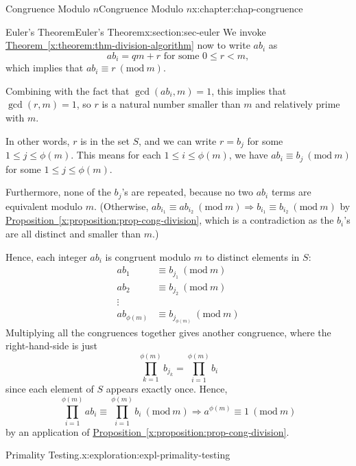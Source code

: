 \documentclass[oneside,10pt,]{book}
\newcommand{\xreffont}{\relax}
\numberwithin{equation}{section}
\newcommand{\Mod}[1]{\ \left(\mathrm{mod}\ #1\right)}
\newcommand{\lt}{<}
\newcommand{\amp}{&}
\begin{document}
\begin{chapterptx}{Congruence Modulo \(n\)}{}{Congruence Modulo \(n\)}{}{}{x:chapter:chap-congruence}
\begin{sectionptx}{Euler's Theorem}{}{Euler's Theorem}{}{}{x:section:sec-euler}
We invoke \hyperref[x:theorem:thm-division-algorithm]{Theorem~{\xreffont\ref{x:theorem:thm-division-algorithm}}} now to write \(ab_i\) as%
\begin{equation*}
ab_i = qm + r \text{ for some } 0 \leq r \lt m,
\end{equation*}
which implies that \(ab_i \equiv r \Mod{m}\).%
\par
Combining with the fact that \(\gcd(ab_i,m) = 1\), this implies that \(\gcd(r,m) = 1\), so \(r\) is a natural number smaller than \(m\) and relatively prime with \(m\).%
\par
In other words, \(r\) is in the set \(S\), and we can write \(r = b_j\) for some \(1 \leq j \leq \phi(m)\). This means for each \(1 \leq i \leq \phi(m)\), we have \(ab_i \equiv b_j \Mod{m}\) for some \(1 \leq j \leq \phi(m)\).%
\par
Furthermore, none of the \(b_j\)'s are repeated, because no two \(ab_i\) terms are equivalent modulo \(m\). (Otherwise, \(ab_{i_1} \equiv ab_{i_2} \Mod{m} \Rightarrow b_{i_1} \equiv b_{i_2} \Mod{m}\) by \hyperref[x:proposition:prop-cong-division]{Proposition~{\xreffont\ref{x:proposition:prop-cong-division}}}, which is a contradiction as the \(b_i\)'s are all distinct and smaller than \(m\).)%
\par
Hence, each integer \(ab_i\) is congruent modulo \(m\) to distinct elements in \(S\):%
\begin{align*}
ab_1 \amp \equiv b_{j_1} \Mod{m}\\
ab_2 \amp \equiv b_{j_2} \Mod{m}\\
\vdots \amp\\
ab_{\phi(m)} \amp \equiv b_{j_{\phi(m)}} \Mod{m}
\end{align*}
Multiplying all the congruences together gives another congruence, where the right-hand-side is just%
\begin{equation*}
\displaystyle\prod_{k=1}^{\phi(m)} b_{j_k} = \displaystyle\prod_{i=1}^{\phi(m)} b_i
\end{equation*}
since each element of \(S\) appears exactly once. Hence,%
\begin{equation*}
\prod_{i=1}^{\phi(m)} ab_i \equiv \prod_{i=1}^{\phi(m)} b_i \Mod{m} \Rightarrow a^{\phi(m)} \equiv 1 \Mod{m}
\end{equation*}
by an application of \hyperref[x:proposition:prop-cong-division]{Proposition~{\xreffont\ref{x:proposition:prop-cong-division}}}.%
\begin{exploration}{Primality Testing.}{x:exploration:expl-primality-testing}%

\end{exploration}
\end{sectionptx}
\end{chapterptx}
\end{document}
